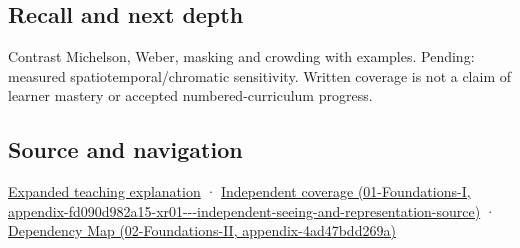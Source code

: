 \subsection{Recall and next depth}\label{appendix-b3aa9e8e01ad-recall-and-next-depth}

Contrast Michelson, Weber, masking and crowding with examples. Pending: measured spatiotemporal/chromatic sensitivity. Written coverage is not a claim of learner mastery or accepted numbered-curriculum progress.

\subsection{Source and navigation}\label{appendix-b3aa9e8e01ad-source-and-navigation}

\href{Continuous\%20Notes/University\%20-\%20Worlds,\%20Images\%20and\%20Inference\%20-\%20Graphics,\%20Vision\%20and\%20Photography\#Visibility\%20is\%20about\%20contrast,\%20conditions\%20and\%20tasks}{Expanded teaching explanation} · \href{../01-Foundations-I/main.pdf\#nameddest=appendix-fd090d982a15-xr01---independent-seeing-and-representation-source}{Independent coverage (01-Foundations-I, appendix-fd090d982a15-xr01-\/-\/-independent-seeing-and-representation-source)} · \href{../02-Foundations-II/main.pdf\#nameddest=appendix-4ad47bdd269a}{Dependency Map (02-Foundations-II, appendix-4ad47bdd269a)}
